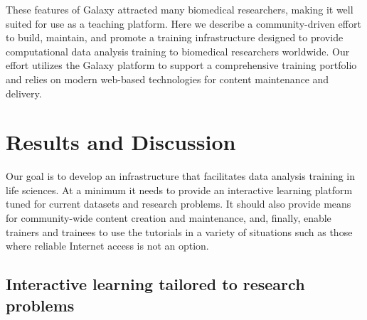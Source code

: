 These features of Galaxy attracted many biomedical researchers, making it well suited for use as a teaching platform. Here we describe a community-driven effort to build, maintain, and promote a training infrastructure designed to provide computational data analysis training to biomedical researchers worldwide. Our effort utilizes the Galaxy platform \cite{afgan2016galaxy} to support a comprehensive training portfolio and relies on modern web-based technologies for content maintenance and delivery.

\section*{Results and Discussion}
Our goal is to develop an infrastructure that facilitates data analysis training in life sciences. At a minimum it needs to provide an interactive learning platform tuned for current datasets and research problems. It should also provide means for community-wide content creation and maintenance, and, finally, enable trainers and trainees to use the tutorials in a variety of situations such as those where reliable Internet access is not an option.

\subsection*{Interactive learning tailored to research problems}

